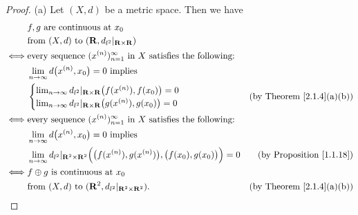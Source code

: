 \begin{proof}{(a)}
    Let \((X, d)\) be a metric space.
    Then we have
    \begin{align*}
             & f, g \text{ are continuous at } x_0                                                                                                                             \\
             & \text{from } (X, d) \text{ to } (\mathbf{R}, d_{l^2}|_{\mathbf{R} \times \mathbf{R}})                                                                                                   \\
        \iff & \text{every sequence } (x^{(n)})_{n = 1}^\infty \text{ in } X \text{ satisfies the following:}                                                                  \\
             & \lim_{n \to \infty} d\big(x^{(n)}, x_0\big) = 0 \text{ implies }                                                                                                \\
             & \begin{cases}
                   \lim_{n \to \infty} d_{l^2}|_{\mathbf{R} \times \mathbf{R}}\big(f(x^{(n)}), f(x_0)\big) = 0 \\
                   \lim_{n \to \infty} d_{l^2}|_{\mathbf{R} \times \mathbf{R}}\big(g(x^{(n)}), g(x_0)\big) = 0
               \end{cases}                                          & \text{(by Theorem \ref{2.1.4}(a)(b))}                                                                    \\
        \iff & \text{every sequence } (x^{(n)})_{n = 1}^\infty \text{ in } X \text{ satisfies the following:}                                                                  \\
             & \lim_{n \to \infty} d\big(x^{(n)}, x_0\big) = 0 \text{ implies }                                                                                                \\
             & \lim_{n \to \infty} d_{l^2}|_{\mathbf{R}^2 \times \mathbf{R}^2}\Big(\big(f(x^{(n)}), g(x^{(n)})\big), \big(f(x_0), g(x_0)\big)\Big) = 0 & \text{(by Proposition \ref{1.1.18})}  \\
        \iff & f \oplus g \text{ is continuous at } x_0                                                                                                                        \\
             & \text{from } (X, d) \text{ to } (\mathbf{R}^2, d_{l^2}|_{\mathbf{R}^2 \times \mathbf{R}^2}).                                                    & \text{(by Theorem \ref{2.1.4}(a)(b))}
    \end{align*}
\end{proof}

